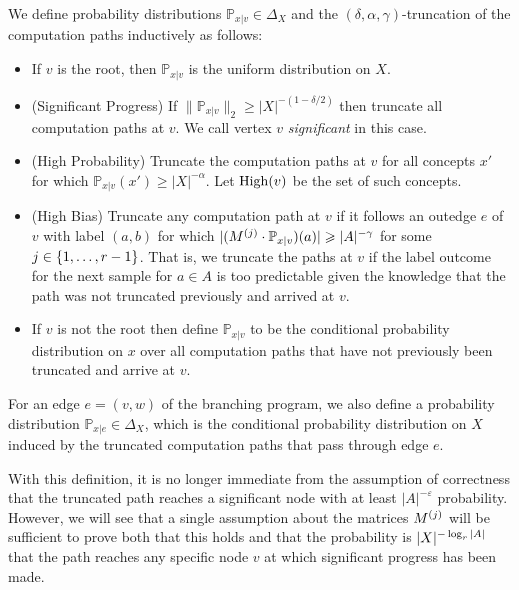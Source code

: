 \begin{defn}
\label{defn:truncation}
We define probability distributions $\mathbb{P}_{x|v}\in \Delta_X$ and the
$(\delta,\alpha,\gamma)$-truncation of the computation paths inductively as
follows:
\begin{itemize}
\setlength\itemsep{0.1ex}
\item If $v$ is the root, then $\mathbb{P}_{x|v}$ is the uniform distribution on
$X$.
\item (Significant Progress) If $\|\mathbb{P}_{x|v}\|_2\ge |X|^{-(1-\delta/2)}$ then
truncate all computation paths at $v$.  We call vertex $v$ \emph{significant}
in this case.
\item (High Probability) Truncate the computation paths at $v$ for all concepts
$x'$ for which  $\mathbb{P}_{x|v}(x')\ge |X|^{-\alpha}$.  Let $\mathrm{High}(v)$ be the
set of such concepts.
\item (High Bias) Truncate any computation path at $v$ if it follows an
outedge $e$ of $v$ with label $(a,b)$ for which $|(M^{(j)}\cdot \mathbb{P}_{x|v})(a)|\geqslant |A|^{-\gamma}$ for some $j\in \{1,\ldots,r-1\}$.
That is, we truncate the paths at $v$ if the label outcome for
the next sample for $a\in A$ is too predictable given the knowledge that
the path was not truncated previously and arrived at $v$.  
\item If $v$ is not the root then define $\mathbb{P}_{x|v}$ to be the 
conditional probability distribution on $x$ over all computation paths that
have not previously been truncated and arrive at $v$.
\end{itemize}
For an edge $e=(v,w)$ of the branching program, we also define a probability
distribution $\mathbb{P}_{x|e}\in \Delta_X$, which is the conditional
probability distribution on $X$ induced by the truncated computation paths
that pass through edge $e$.
\end{defn}

With this definition, it is no longer immediate from the assumption of
correctness that the truncated path reaches a significant node with
at least $|A|^{-\varepsilon}$ probability.  However, we will see that a single
assumption about the
matrices $M^{(j)}$ will be sufficient to prove both that this holds and that 
the probability is $|X|^{-\log_r |A|}$ that the path reaches any specific node
$v$ at which significant progress has been made.



